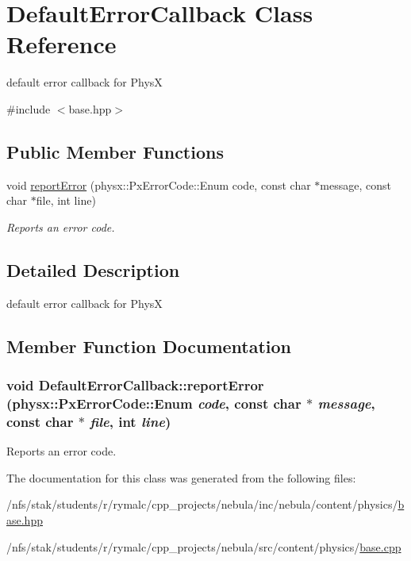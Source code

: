 \hypertarget{classDefaultErrorCallback}{
\section{DefaultErrorCallback Class Reference}
\label{classDefaultErrorCallback}
}


default error callback for PhysX  


{\ttfamily \#include $<$base.hpp$>$}\subsection*{Public Member Functions}
\begin{DoxyCompactItemize}
\item 
void \hyperlink{classDefaultErrorCallback_ab2d070f820c2a5451c45fa195bd71c55}{reportError} (physx::PxErrorCode::Enum code, const char $\ast$message, const char $\ast$file, int line)
\begin{DoxyCompactList}\small\item\em Reports an error code. \item\end{DoxyCompactList}\end{DoxyCompactItemize}


\subsection{Detailed Description}
default error callback for PhysX 

\subsection{Member Function Documentation}
\hypertarget{classDefaultErrorCallback_ab2d070f820c2a5451c45fa195bd71c55}{
\subsubsection[{reportError}]{\setlength{\rightskip}{0pt plus 5cm}void DefaultErrorCallback::reportError (physx::PxErrorCode::Enum {\em code}, \/  const char $\ast$ {\em message}, \/  const char $\ast$ {\em file}, \/  int {\em line})}}
\label{classDefaultErrorCallback_ab2d070f820c2a5451c45fa195bd71c55}


Reports an error code. 

The documentation for this class was generated from the following files:\begin{DoxyCompactItemize}
\item 
/nfs/stak/students/r/rymalc/cpp\_\-projects/nebula/inc/nebula/content/physics/\hyperlink{inc_2nebula_2content_2physics_2base_8hpp}{base.hpp}\item 
/nfs/stak/students/r/rymalc/cpp\_\-projects/nebula/src/content/physics/\hyperlink{src_2content_2physics_2base_8cpp}{base.cpp}\end{DoxyCompactItemize}
